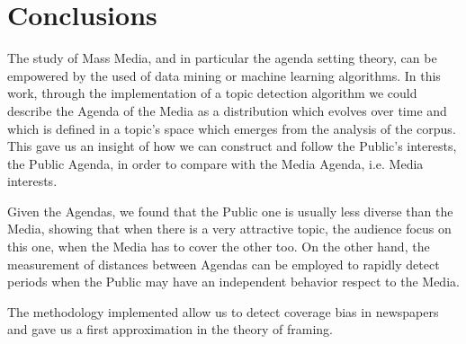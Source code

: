 \documentclass{bmcart}
\begin{document}
\section*{Conclusions}

\par The study of Mass Media, and in particular the agenda setting theory, can be empowered by the used of data mining or machine learning algorithms.
In this work, through the implementation of a topic detection algorithm we could describe the Agenda of the Media as a distribution which evolves over time and which is defined in a topic's space which emerges from the analysis of the corpus.
This gave us an insight of how we can construct and follow the Public's interests, the Public Agenda, in order to compare with the Media Agenda, i.e. Media interests.
\par Given the Agendas, we found that the Public one is usually less diverse than the Media, showing that when there is a very attractive topic, the audience focus on this one, when the Media has to cover the other too.
On the other hand, the measurement of distances between Agendas can be employed to rapidly detect periods when the Public may have an independent behavior respect to the Media.
\par The methodology implemented allow us to detect coverage bias in newspapers and gave us a first approximation in the theory of framing.



\end{document}
